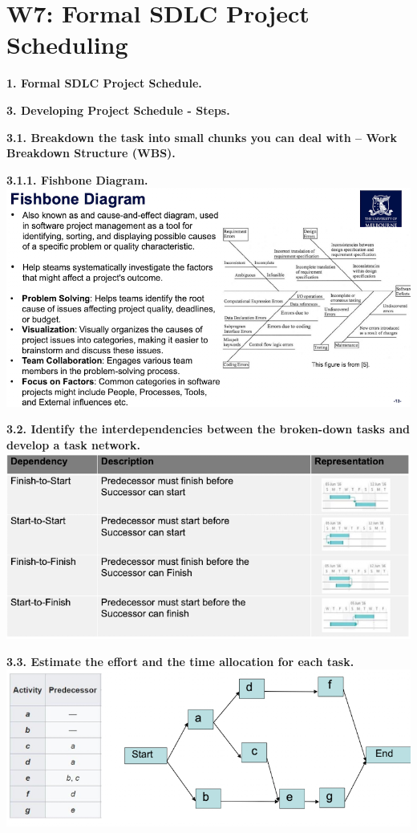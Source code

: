 \section{W7: Formal SDLC Project Scheduling}

\textbf{1. Formal SDLC Project Schedule.}

\textbf{3. Developing Project Schedule - Steps.}

    \textbf{3.1. Breakdown the task into small chunks you can deal with – Work Breakdown Structure (WBS).}

        \textbf{3.1.1. Fishbone Diagram.}
        \includegraphics[width=\linewidth]{figs/SCR-20240606-oxhd.png}

    \textbf{3.2. Identify the interdependencies between the broken-down tasks and develop a task network.}
    \includegraphics[width=\linewidth]{figs/SCR-20240606-oyge.png}

    \textbf{3.3. Estimate the effort and the time allocation for each task.}
    \includegraphics[width=\linewidth]{figs/SCR-20240606-oyqc.png}

